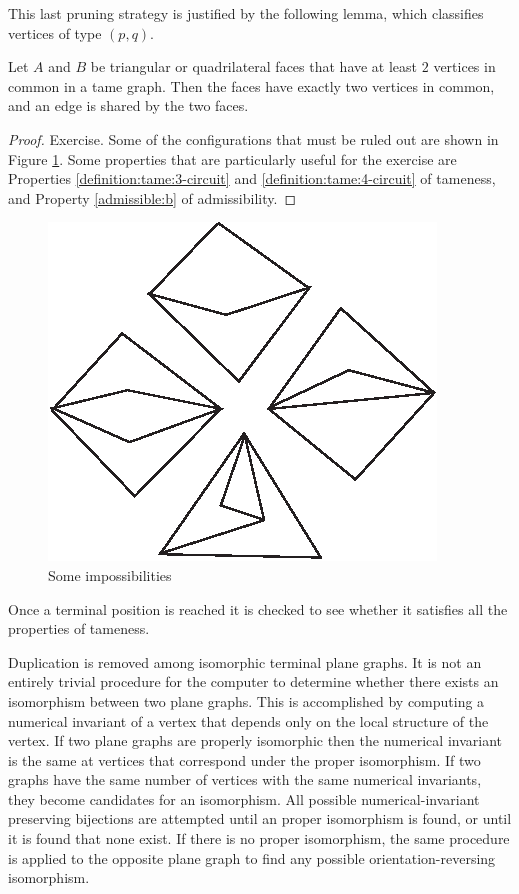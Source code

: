 This last pruning strategy is justified by the following lemma,
which classifies vertices of type $(p,q)$.

\begin{lemma}
Let $A$ and $B$ be triangular or quadrilateral faces that have at
least $2$ vertices in common in a tame graph. Then the faces have
exactly two vertices in common, and an edge is shared by the two
faces.
\end{lemma}

\begin{proof}
Exercise.  Some of the configurations that must be ruled out are
shown in Figure \ref{fig:nonexistant}.  Some properties that are
particularly useful for the exercise are Properties
\ref{definition:tame:3-circuit} and
\ref{definition:tame:4-circuit} of tameness, and Property
\ref{admissible:b} of admissibility.
\end{proof}
\begin{figure}[htb]
  \centering
  \includegraphics{PS/impossible.eps}
  \caption{Some impossibilities}
  \label{fig:nonexistant}
\end{figure}

Once a terminal position is reached it is checked to see whether
it satisfies all the properties of tameness.

Duplication is removed among isomorphic terminal plane graphs. It
is not an entirely trivial procedure for the computer to determine
whether there exists an isomorphism between two plane graphs. This
is accomplished by computing a numerical invariant of a vertex
that depends only on the local structure of the vertex. If two
plane graphs are properly isomorphic then the numerical invariant
is the same at vertices that correspond under the proper
isomorphism.  If two graphs have the same number of vertices with
the same numerical invariants, they become candidates for an
isomorphism.  All possible numerical-invariant preserving
bijections are attempted until an proper isomorphism is found, or
until it is found that none exist. If there is no proper
isomorphism, the same procedure is applied to the opposite plane
graph to find any possible orientation-reversing isomorphism.

